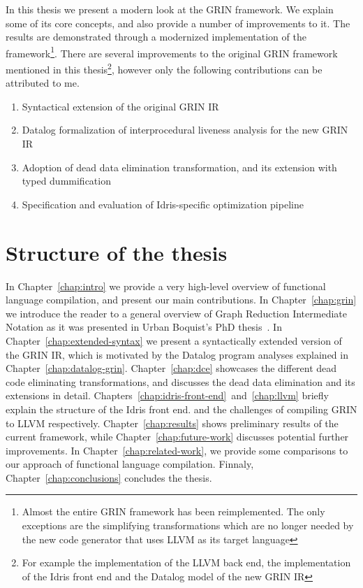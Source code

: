 \documentclass[main.tex]{subfiles}
\begin{document}
	In this thesis we present a modern look at the GRIN framework. We explain some of its core concepts, and also provide a number of improvements to it. The results are demonstrated through a modernized implementation of the framework\footnote{Almost the entire GRIN framework has been reimplemented. The only exceptions are the simplifying transformations which are no longer needed by the new code generator that uses LLVM as its target language}. There are several improvements to the original GRIN framework mentioned in this thesis\footnote{For example the implementation of the LLVM back end, the implementation of the Idris front end and the Datalog model of the new GRIN IR}, however only the following contributions can be attributed to me.
	
	\hspace{0.5cm}
	\begin{enumerate}
		\item Syntactical extension of the original GRIN IR
		
		\item Datalog formalization of interprocedural liveness analysis for the new GRIN IR 
		
		\item Adoption of dead data elimination transformation, and its extension with typed dummification
		
		\item Specification and evaluation of Idris-specific optimization pipeline
	\end{enumerate}

	\section{Structure of the thesis}
	
	In Chapter~\ref{chap:intro} we provide a very high-level overview of functional language compilation, and present our main contributions. In Chapter~\ref{chap:grin} we introduce the reader to a general overview of Graph Reduction Intermediate Notation as it was presented in Urban Boquist's PhD thesis~\cite{boquist-phd}. In Chapter~\ref{chap:extended-syntax} we present a syntactically extended version of the GRIN IR, which is motivated by the Datalog program analyses explained in Chapter~\ref{chap:datalog-grin}. Chapter~\ref{chap:dce} showcases the different dead code eliminating transformations, and discusses the dead data elimination and its extensions in detail. Chapters~\ref{chap:idris-front-end}~and~\ref{chap:llvm} briefly explain the structure of the Idris front end. and the challenges of compiling GRIN to LLVM respectively. Chapter~\ref{chap:results} shows preliminary results of the current framework, while Chapter~\ref{chap:future-work} discusses potential further improvements. In Chapter~\ref{chap:related-work}, we provide some comparisons to our approach of functional language compilation. Finnaly, Chapter~\ref{chap:conclusions} concludes the thesis.
	
\end{document}

